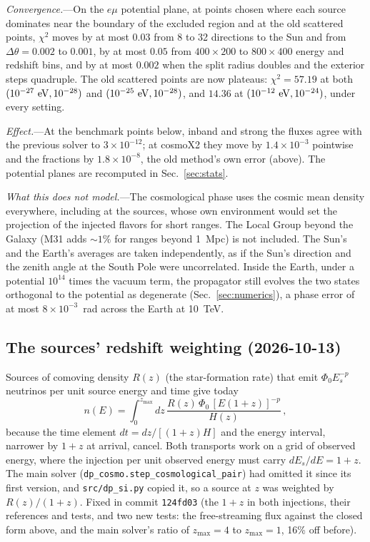 \documentclass[11pt,a4paper]{article}
\newcommand{\file}[1]{\nolinkurl{#1}}
\begin{document}
\textit{Convergence.}---On the $e\mu$ potential plane, at points chosen where each source dominates
near the boundary of the excluded region and at the old scattered points, $\chi^2$ moves by at most
$0.03$ from 8 to 32 directions to the Sun and from $\Delta\theta = 0.002$ to $0.001$, by at most
$0.05$ from $400\times200$ to $800\times400$ energy and redshift bins, and by at most $0.002$ when
the split radius doubles and the exterior steps quadruple. The old scattered points are now
plateaus: $\chi^2 = 57.19$ at both $(10^{-27}~{\rm eV}, 10^{-28})$ and $(10^{-25}~{\rm eV},
10^{-28})$, and $14.36$ at $(10^{-12}~{\rm eV}, 10^{-24})$, under every setting.

\textit{Effect.}---At the benchmark points below, inband and strong the fluxes agree with the
previous solver to $3\times10^{-12}$; at cosmoX2 they move by $1.4\times10^{-3}$ pointwise and the
fractions by $1.8\times10^{-8}$, the old method's own error (above). The potential planes are
recomputed in Sec.~\ref{sec:stats}.

\textit{What this does not model.}---The cosmological phase uses the cosmic mean density
everywhere, including at the sources, whose own environment would set the projection of the
injected flavors for short ranges. The Local Group beyond the Galaxy (M31 adds $\sim1\%$ for ranges
beyond 1~Mpc) is not included. The Sun's and the Earth's averages are taken independently, as if
the Sun's direction and the zenith angle at the South Pole were uncorrelated. Inside the Earth,
under a potential $10^{14}$ times the vacuum term, the propagator still evolves the two states
orthogonal to the potential as degenerate (Sec.~\ref{sec:numerics}), a phase error of at most
$8\times10^{-3}$~rad across the Earth at 10~TeV.

\subsection{The sources' redshift weighting (2026-10-13)}
\label{app:source_jacobian}

Sources of comoving density $R(z)$ (the star-formation rate) that emit $\Phi_0E_s^{-p}$ neutrinos
per unit source energy and time give today
\begin{equation}
n(E) = \int_0^{z_{\max}}dz\,\frac{R(z)\,\Phi_0\,[E(1+z)]^{-p}}{H(z)}\,,
\end{equation}
because the time element $dt = dz/[(1+z)H]$ and the energy interval, narrower by $1+z$ at arrival,
cancel. Both transports work on a grid of observed energy, where the injection per unit observed
energy must carry $dE_s/dE = 1+z$. The main solver (\file{dp_cosmo.step_cosmological_pair}) had
omitted it since its first version, and \file{src/dp_si.py} copied it, so a source at $z$ was weighted
by $R(z)/(1+z)$. Fixed in commit \texttt{124fd03} (the $1+z$ in both injections, their references and tests,
and two new tests: the free-streaming flux against the closed form above, and the main solver's ratio
of $z_{\max} = 4$ to $z_{\max} = 1$, 16\% off before).
\end{document}
